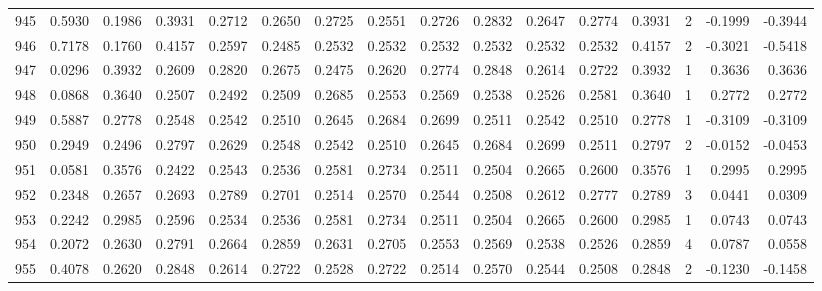 \begin{tabular}{lrrrrrrrrrrrrrrr}
945 &      0.5930 &  0.1986 &  0.3931 &  0.2712 &  0.2650 &  0.2725 &  0.2551 &  0.2726 &  0.2832 &  0.2647 &   0.2774 &     0.3931 &      2 &                   -0.1999 &                    -0.3944 \\
946 &      0.7178 &  0.1760 &  0.4157 &  0.2597 &  0.2485 &  0.2532 &  0.2532 &  0.2532 &  0.2532 &  0.2532 &   0.2532 &     0.4157 &      2 &                   -0.3021 &                    -0.5418 \\
947 &      0.0296 &  0.3932 &  0.2609 &  0.2820 &  0.2675 &  0.2475 &  0.2620 &  0.2774 &  0.2848 &  0.2614 &   0.2722 &     0.3932 &      1 &                    0.3636 &                     0.3636 \\
948 &      0.0868 &  0.3640 &  0.2507 &  0.2492 &  0.2509 &  0.2685 &  0.2553 &  0.2569 &  0.2538 &  0.2526 &   0.2581 &     0.3640 &      1 &                    0.2772 &                     0.2772 \\
949 &      0.5887 &  0.2778 &  0.2548 &  0.2542 &  0.2510 &  0.2645 &  0.2684 &  0.2699 &  0.2511 &  0.2542 &   0.2510 &     0.2778 &      1 &                   -0.3109 &                    -0.3109 \\
950 &      0.2949 &  0.2496 &  0.2797 &  0.2629 &  0.2548 &  0.2542 &  0.2510 &  0.2645 &  0.2684 &  0.2699 &   0.2511 &     0.2797 &      2 &                   -0.0152 &                    -0.0453 \\
951 &      0.0581 &  0.3576 &  0.2422 &  0.2543 &  0.2536 &  0.2581 &  0.2734 &  0.2511 &  0.2504 &  0.2665 &   0.2600 &     0.3576 &      1 &                    0.2995 &                     0.2995 \\
952 &      0.2348 &  0.2657 &  0.2693 &  0.2789 &  0.2701 &  0.2514 &  0.2570 &  0.2544 &  0.2508 &  0.2612 &   0.2777 &     0.2789 &      3 &                    0.0441 &                     0.0309 \\
953 &      0.2242 &  0.2985 &  0.2596 &  0.2534 &  0.2536 &  0.2581 &  0.2734 &  0.2511 &  0.2504 &  0.2665 &   0.2600 &     0.2985 &      1 &                    0.0743 &                     0.0743 \\
954 &      0.2072 &  0.2630 &  0.2791 &  0.2664 &  0.2859 &  0.2631 &  0.2705 &  0.2553 &  0.2569 &  0.2538 &   0.2526 &     0.2859 &      4 &                    0.0787 &                     0.0558 \\
955 &      0.4078 &  0.2620 &  0.2848 &  0.2614 &  0.2722 &  0.2528 &  0.2722 &  0.2514 &  0.2570 &  0.2544 &   0.2508 &     0.2848 &      2 &                   -0.1230 &                    -0.1458 \\

\end{tabular}
